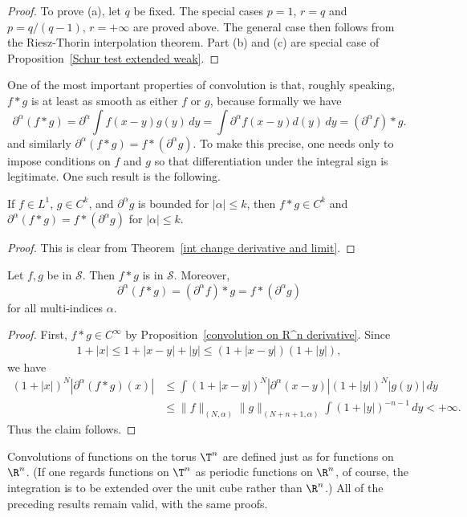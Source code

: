 \begin{proof}
To prove (a), let $q$ be fixed. The special cases $p=1$, $r=q$ and $p=q/(q-1)$, $r=+\infty$ are proved above. The general case then follows from the Riesz-Thorin interpolation theorem. Part (b) and (c) are special case of Proposition~\ref{Schur test extended weak}.
\end{proof}
One of the most important properties of convolution is that, roughly speaking, $f\ast g$ is at least as smooth as either $f$ or $g$, because formally we have
\[\partial^\alpha(f\ast g)=\partial^\alpha\int f(x-y)g(y)\,dy=\int\partial^\alpha f(x-y)d(y)\,dy=(\partial^\alpha f)\ast g.\]
and similarly $\partial^\alpha(f\ast g)=f\ast(\partial^\alpha g)$. To make this precise, one needs only to impose conditions on $f$ and $g$ so that differentiation under the integral sign is legitimate. One such result is the following.
\begin{proposition}\label{convolution on R^n derivative}
If $f\in L^1$, $g\in C^k$, and $\partial^\alpha g$ is bounded for $|\alpha|\leq k$, then $f\ast g\in C^k$ and $\partial^\alpha(f\ast g)=f\ast(\partial^\alpha g)$ for $|\alpha|\leq k$.
\end{proposition}
\begin{proof}
This is clear from Theorem~\ref{int change derivative and limit}.
\end{proof}
\begin{proposition}
Let $f,g$ be in $\mathscr{S}$. Then $f\ast g$ is in $\mathscr{S}$. Moreover,
\[\partial^\alpha(f\ast g)=(\partial^\alpha f)\ast g=f\ast(\partial^\alpha g)\]
for all multi-indices $\alpha$.
\end{proposition}
\begin{proof}
First, $f\ast g\in C^\infty$ by Proposition~\ref{convolution on R^n derivative}. Since
\begin{align}\label{convolution on schwarz}
1+|x|\leq 1+|x-y|+|y|\leq (1+|x-y|)(1+|y|),
\end{align}
we have
\begin{align*}
(1+|x|)^{N}|\partial^\alpha(f\ast g)(x)|&\leq\int (1+|x-y|)^N|\partial^\alpha(x-y)|(1+|y|)^N|g(y)|\,dy\\
&\leq\|f\|_{(N,\alpha)}\|g\|_{(N+n+1,\alpha)}\int(1+|y|)^{-n-1}\,dy<+\infty.
\end{align*}
Thus the claim follows.
\end{proof}
Convolutions of functions on the torus $\T^n$ are defined just as for functions on $\R^n$. (If one regards functions on $\T^n$ as periodic functions on $\R^n$, of course, the integration is to be extended over the unit cube rather than $\R^n$.) All of the preceding results remain valid, with the same proofs.\par
